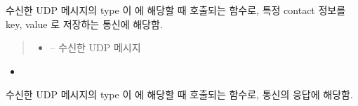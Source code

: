 \documentclass[a4paper,10pt,english]{sphinxmanual}
\begin{document}
\begin{fulllineitems}
\begin{fulllineitems}
\begin{quote}
\begin{description}
\end{description}\end{quote}

\end{fulllineitems}


\begin{fulllineitems}
\label{\detokenize{_kademlia:KNode._onStore}}
\pysigstartsignatures
{}
\pysigstopsignatures
\sphinxAtStartPar
수신한 UDP 메시지의 type 이  에 해당할 때 호출되는 함수로,
특정 contact 정보를 key, value 로 저장하는 통신에 해당함.
\begin{quote}\begin{description}
\begin{itemize}
\item {} 
\sphinxAtStartPar
{} – 수신한 UDP 메시지

\end{itemize}

\end{description}\end{quote}


\nopagebreak

\begin{itemize}
\item {} 
\sphinxAtStartPar
{\hyperref[\detokenize{_kademlia:KNode.set}]{}}

\end{itemize}



\end{fulllineitems}


\begin{fulllineitems}
\label{\detokenize{_kademlia:KNode._onStoreReply}}
\pysigstartsignatures
{}
\pysigstopsignatures
\sphinxAtStartPar
수신한 UDP 메시지의 type 이  에 해당할 때 호출되는 함수로,
 통신의 응답에 해당함.



\end{fulllineitems}
\end{fulllineitems}
\end{document}
